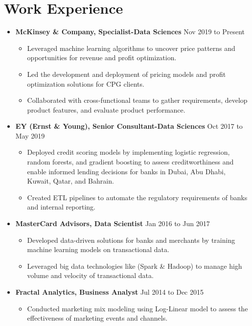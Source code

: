 \documentclass[a4paper,12pt]{article}
\begin{document}
\section*{Work Experience}
\begin{itemize}[leftmargin=0.2cm, label={}]
    \item \textbf{McKinsey \& Company, Specialist-Data Sciences} \hfill \textnormal{Nov 2019 to Present}
    \begin{itemize}[leftmargin=0.5cm, label={\textbullet}]
        \item Leveraged machine learning algorithms to uncover price patterns and opportunities for revenue and profit optimization.
        \item Led the development and deployment of pricing models and profit optimization solutions for CPG clients.
        \item Collaborated with cross-functional teams to gather requirements, develop product features, and evaluate product performance.
    \end{itemize}
    
    \item \textbf{EY (Ernst \& Young), Senior Consultant-Data Sciences} \hfill \textnormal{Oct 2017 to May 2019}
    \begin{itemize}[leftmargin=0.5cm, label={\textbullet}]
        \item Deployed credit scoring models by implementing logistic regression, random forests, and gradient boosting to assess creditworthiness and enable informed lending decisions for banks in Dubai, Abu Dhabi, Kuwait, Qatar, and Bahrain.
        \item Created ETL pipelines to automate the regulatory requirements of banks and internal reporting.
    \end{itemize}
    
    \item \textbf{MasterCard Advisors, Data Scientist} \hfill \textnormal{Jan 2016 to Jun 2017}
    \begin{itemize}[leftmargin=0.5cm, label={\textbullet}]
        \item Developed data-driven solutions for banks and merchants by training machine learning models on transactional data.
        \item Leveraged big data technologies like (Spark \& Hadoop) to manage high volume and velocity of transactional data.
    \end{itemize}
    
    \item \textbf{Fractal Analytics, Business Analyst} \hfill \textnormal{Jul 2014 to Dec 2015}
    \begin{itemize}[leftmargin=0.5cm, label={\textbullet}]
        \item Conducted marketing mix modeling using Log-Linear model to assess the effectiveness of marketing events and channels.
    \end{itemize}
\end{itemize}
\end{document}

